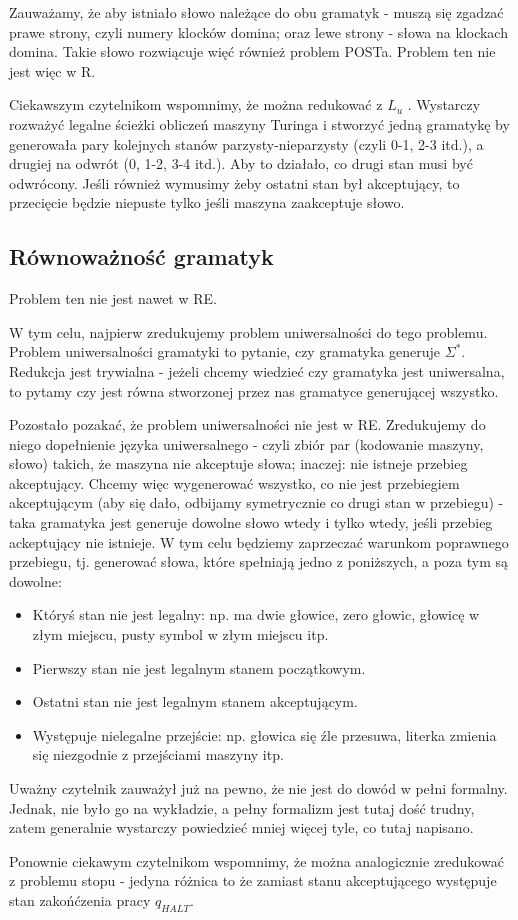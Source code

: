 Zauważamy, że aby istniało słowo należące do obu gramatyk - muszą się zgadzać prawe strony, czyli numery klocków domina; oraz lewe strony - słowa na klockach domina. Takie słowo rozwiącuje więć również problem POSTa. Problem ten nie jest więc w R.

Ciekawszym czytelnikom wspomnimy, że można redukować z \( L_u \) . Wystarczy rozważyć legalne ścieżki obliczeń maszyny Turinga i stworzyć jedną gramatykę by generowała pary kolejnych stanów parzysty-nieparzysty (czyli 0-1, 2-3 itd.), a drugiej na odwrót (0, 1-2, 3-4 itd.). Aby to działało, co drugi stan musi być odwrócony. Jeśli również wymusimy żeby ostatni stan był akceptujący, to przecięcie będzie niepuste tylko jeśli maszyna zaakceptuje słowo.

\subsection{Równoważność gramatyk}

Problem ten nie jest nawet w RE.

W tym celu, najpierw zredukujemy problem uniwersalności do tego problemu. Problem uniwersalności gramatyki to pytanie, czy gramatyka generuje \( \Sigma^* \). Redukcja jest trywialna - jeżeli chcemy wiedzieć czy gramatyka jest uniwersalna, to pytamy czy jest równa stworzonej przez nas gramatyce generującej wszystko.

Pozostało pozakać, że problem uniwersalności nie jest w RE. Zredukujemy do niego dopełnienie języka uniwersalnego - czyli zbiór par (kodowanie maszyny, słowo) takich, że maszyna nie akceptuje słowa; inaczej: nie istneje przebieg akceptujący. Chcemy więc wygenerować wszystko, co nie jest przebiegiem akceptującym (aby się dało, odbijamy symetrycznie co drugi stan w przebiegu) - taka gramatyka jest generuje dowolne słowo wtedy i tylko wtedy, jeśli przebieg ackeptujący nie istnieje. W tym celu będziemy zaprzeczać warunkom poprawnego przebiegu, tj. generować słowa, które spełniają jedno z poniższych, a poza tym są dowolne:

\begin{itemize}
    \item Któryś stan nie jest legalny: np. ma dwie głowice, zero głowic, głowicę w złym miejscu, pusty symbol w złym miejscu itp.
    \item Pierwszy stan nie jest legalnym stanem początkowym.
    \item Ostatni stan nie jest legalnym stanem akceptującym.
    \item Występuje nielegalne przejście: np. głowica się źle przesuwa, literka zmienia się niezgodnie z przejściami maszyny itp.
\end{itemize}

Uważny czytelnik zauważył już na pewno, że nie jest do dowód w pełni formalny. Jednak, nie było go na wykładzie, a pełny formalizm jest tutaj dość trudny, zatem generalnie wystarczy powiedzieć mniej więcej tyle, co tutaj napisano.

Ponownie ciekawym czytelnikom wspomnimy, że można analogicznie zredukować z problemu stopu - jedyna różnica to że zamiast stanu akceptującego występuje stan zakońćzenia pracy \( q_{HALT} \).